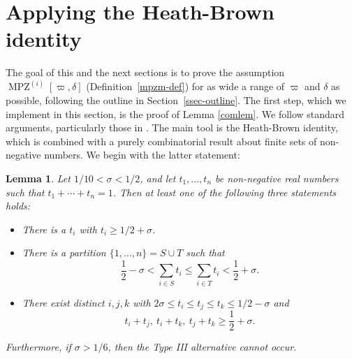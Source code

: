 \documentclass[12pt,a4paper,reqno]{amsart}
\numberwithin{equation}{section}
\DeclareMathOperator*\MPZ{MPZ}
\theoremstyle{plain}
\newtheorem{lemma}[theorem]{Lemma}
\theoremstyle{definition}
\begin{document}
\section{Applying the Heath-Brown identity}\label{heath-brown-sec}

The goal of this and the next sections is to prove the assumption
$\MPZ^{(i)}[\varpi,\delta]$ (Definition~\ref{mpzm-def}) for as wide a
range of $\varpi$ and $\delta$ as possible, following the outline in
Section~\ref{ssec-outline}. The first step, which we implement in this
section, is the proof of Lemma \ref{comlem}.  We follow standard
arguments, particularly those in \cite{zhang}. The main tool is the
Heath-Brown identity, which is combined with a purely combinatorial
result about finite sets of non-negative numbers.  We begin with the
latter statement:

\begin{lemma}\label{sum}  
  Let $1/10 < \sigma < 1/2$, and let $t_1,\ldots,t_n$ be non-negative
  real numbers such that $t_1+\cdots+t_n=1$.  Then at least one of the
  following three statements holds:
\begin{itemize}
\item[(Type 0)] There is a $t_i$ with $t_i \geq 1/2 + \sigma$.
\item[(Type I/II)] There is a partition $\{1,\ldots,n\} = S \cup T$ such that
$$ \frac{1}{2} - \sigma < \sum_{i \in S} t_i \leq \sum_{i \in T} t_i < \frac{1}{2} + \sigma.$$
\item[(Type III)] There exist distinct $i,j,k$ with $2\sigma \leq t_i
  \leq t_j \leq t_k \leq 1/2-\sigma$ and 
\begin{equation}\label{eq-type-iii-last}
t_i+t_j,\ t_i+t_k,\ t_j+t_k \geq \frac{1}{2} + \sigma.
\end{equation}
\end{itemize}
Furthermore, if $\sigma > 1/6$, then the Type III alternative cannot
occur.
\end{lemma}
\end{document}
